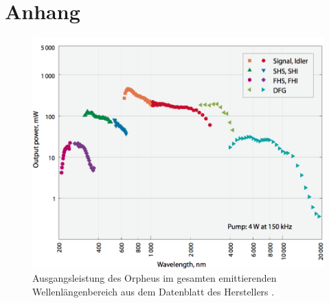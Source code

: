 \documentclass[bachelor,       %
               twoside,        %
               BCOR10mm,       %
               english,ngerman, %
               ]{GAUBM}
\begin{document}
\chapter{Anhang}
\begin{figure}[h]
	\centering
	\includegraphics[width=0.7\linewidth]{Orpheus_Tuning_Curve}
	\caption{Ausgangsleistung des Orpheus im gesamten emittierenden Wellenlängenbereich aus dem Datenblatt des Herstellers \cite{orpheus_tuningcurve}.}
	\label{fig:orpheus_tuningcurve}
\end{figure}


\cleardoublepage

\Declaration
\end{document}
